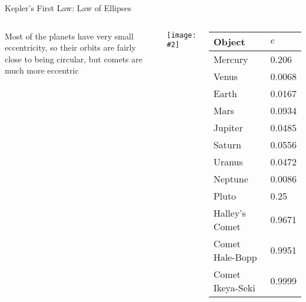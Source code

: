 \documentclass[12pt,compress,aspectratio=169]{beamer}
\newcommand{\pic}[2]{\texttt{[image: \#2]}}
\begin{document}
\begin{frame}{Kepler's First Law: Law of Ellipses}
  \begin{columns}
    Most of the planets have very small eccentricity, so their orbits are
    fairly close to being circular, but comets are much more eccentric
    \begin{center}
      \pic{.7}{kep5.png}
    \end{center}
    
    \begin{tabular}{l|l}
      \rowcolor{pink}
      \textbf{Object} & $e$ \\ \hline
      Mercury	& \num{.206} \\
      Venus	& \num{.0068} \\
      Earth	& \num{.0167} \\
      Mars	& \num{.0934} \\
      Jupiter	& \num{.0485} \\
      Saturn	& \num{.0556} \\
      Uranus	& \num{.0472} \\
      Neptune	& \num{.0086} \\
      Pluto	& \num{.25} \\ \hline
      Halley's Comet   & \num{.9671} \\
      Comet Hale-Bopp  & \num{.9951} \\
      Comet Ikeya-Seki & \num{.9999}
    \end{tabular}
  \end{columns}
\end{frame}
\end{document}
